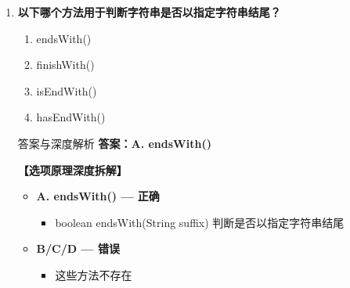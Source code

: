 \documentclass[12pt, a4paper]{ctexart}
\begin{document}
\begin{enumerate}[label=\textbf{\arabic*.}]
\begin{bluebox}{答案与深度解析}
\begin{itemize}[label={}, leftmargin=*, nosep]
\begin{itemize}[label={}, nosep]
			      \item boolean startsWith(String prefix) 判断是否以指定字符串开头

					  \end{itemize}
		      \item \textbf{B/C/D — 错误}
					  \begin{itemize}[label={}, nosep]
		      
			      \item 这些方法不存在
		      
		      

	      
					  \end{itemize}
					  \end{itemize}
\end{bluebox}

	      \vspace{1em}

	\item \textbf{以下哪个方法用于判断字符串是否以指定字符串结尾？}
	      \begin{enumerate}[label=\Alph*.]
		      \item endsWith()
		      \item finishWith()
		      \item isEndWith()
		      \item hasEndWith()
	      \end{enumerate}

	      \begin{bluebox}{答案与深度解析}
		      \textbf{答案：A. endsWith()}

		      \textbf{【选项原理深度拆解】}
					  \begin{itemize}[label={}, leftmargin=*, nosep]


		      \item \textbf{A. endsWith() — 正确}
					  \begin{itemize}[label={}, nosep]
		      
			      \item boolean endsWith(String suffix) 判断是否以指定字符串结尾

					  \end{itemize}
		      \item \textbf{B/C/D — 错误}
					  \begin{itemize}[label={}, nosep]
		      
			      \item 这些方法不存在
		      
		      
			  

\end{itemize}
\end{itemize}
\end{bluebox}
\end{enumerate}
\end{document}

